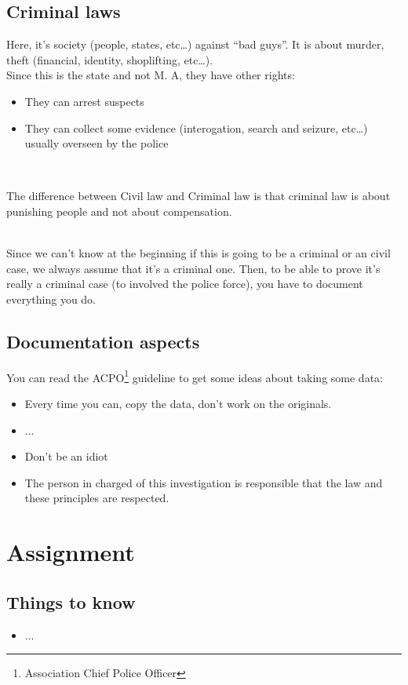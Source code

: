 \subsection{Criminal laws}
Here, it's society (people, states, etc\ldots) against \enquote{bad guys}. It is about murder, theft (financial, identity, shoplifting, etc\ldots).\\
Since this is the state and not M. A, they have other rights:
\begin{itemize}
 \item They can arrest suspects
 \item They can collect some evidence (interogation, search and seizure, etc\ldots) usually overseen by the police
\end{itemize}
~\\\par
The difference between Civil law and Criminal law is that criminal law is about punishing people and not about compensation.\\
~\\\par
Since we can't know at the beginning if this is going to be a criminal or an civil case, we always assume that it's a criminal one. Then, to be able to prove it's really a criminal case (to involved the police force), you have to document everything you do.
\subsection{Documentation aspects}
You can read the ACPO\footnote{Association Chief Police Officer} guideline to get some ideas about taking some data:
\begin{itemize}
 \item Every time you can, copy the data, don't work on the originals.
 \item ...
 \item Don't be an idiot
 \item The person in charged of this investigation is responsible that the law and these principles are respected.
\end{itemize}
\section{Assignment}
\subsection{Things to know}
\begin{itemize}
 \item ...
\end{itemize}

